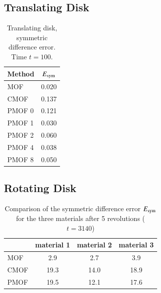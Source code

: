 \documentclass[preprint,12pt]{Definitions/elsarticle}
\newcommand{\tn}{\textnormal}
\begin{document}
\subsection{Translating Disk}

\begin{table}[H]
	\centering
	\caption{Translating disk, symmetric difference error. Time $t=100$.}
	\renewcommand{\arraystretch}{1.2} 
	\begin{tabular}{|l|c|}
		\hline
		Method   & $E_\tn{sym}$  \\ \hline
		MOF      & 0.020    \\ \hline
		CMOF     & 0.137  \\ \hline
		PMOF 0   & 0.121  \\ \hline
		PMOF 1   & 0.030 \\ \hline
		PMOF 2   & 0.060  \\ \hline
		PMOF 4   & 0.038   \\ \hline
		PMOF 8   & 0.050   \\ \hline
	\end{tabular}
	\label{errortable_translatingdisk}
\end{table}

\FloatBarrier
\subsection{Rotating Disk}
\begin{table}[H]
	\centering	
	\caption{Comparison of the symmetric difference error $E_\tn{sym}$ for the three materials after 5 revolutions ($t=3140$)}
	\renewcommand{\arraystretch}{1.2} %
	\begin{tabular}{|l|c|c|c|}
		\hline
		& material 1   & material 2  & material 3
		\\ \hline 
		MOF & 2.9  & 2.7  & 3.9
		\\ \hline 
		CMOF & 19.3  & 14.0  & 18.9
		\\ \hline
		PMOF & 19.5 & 12.1   & 17.6
		\\ \hline
	\end{tabular}  
	\label{diskerror}	
\end{table}
\end{document}
